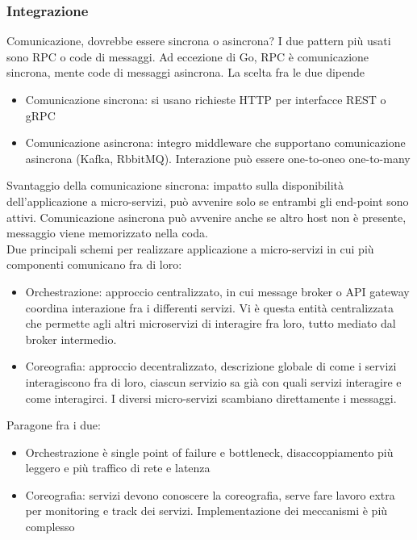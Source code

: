 \documentclass[16px]{article}
\begin{document}
\subsubsection{Integrazione}
Comunicazione, dovrebbe essere sincrona o asincrona? I due pattern più usati sono RPC o code di messaggi. Ad eccezione di Go, RPC è comunicazione sincrona,  mente code di messaggi asincrona. La scelta fra le due dipende
\begin{itemize}
\item Comunicazione sincrona: si usano richieste HTTP per interfacce REST o gRPC
\item Comunicazione asincrona: integro middleware che supportano comunicazione asincrona (Kafka, RbbitMQ). Interazione può essere one-to-oneo one-to-many
\end{itemize}
Svantaggio della comunicazione sincrona: impatto sulla disponibilità dell'applicazione a micro-servizi, può avvenire solo se entrambi gli end-point sono attivi. Comunicazione asincrona può avvenire anche se altro host non è presente, messaggio viene memorizzato nella coda.
\\ Due principali schemi per realizzare applicazione a micro-servizi in cui più componenti comunicano fra di loro:
\begin{itemize}
\item Orchestrazione: approccio centralizzato, in cui message broker o API gateway coordina interazione fra i differenti servizi. Vi è questa entità centralizzata che permette agli altri microservizi di interagire fra loro, tutto mediato dal broker intermedio.
\item Coreografia: approccio decentralizzato, descrizione globale di come i servizi interagiscono fra di loro, ciascun servizio sa già con quali servizi interagire e come interagirci. I diversi micro-servizi scambiano direttamente i messaggi.
\end{itemize}
Paragone fra i due:
\begin{itemize}
\item Orchestrazione è single point of failure e bottleneck, disaccoppiamento più leggero e più traffico di rete e latenza
\item Coreografia: servizi devono conoscere la coreografia, serve fare lavoro extra per monitoring e track dei servizi. Implementazione dei meccanismi è più complesso
\end{itemize}
\end{document}
